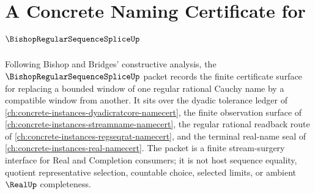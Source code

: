 \chapter{A Concrete Naming Certificate for $\BishopRegularSequenceSpliceUp$}
\label{ch:concrete-instances-bishop-regular-sequence-splice-namecert}

Following Bishop and Bridges' constructive analysis, the $\BishopRegularSequenceSpliceUp$ packet records the finite certificate surface for replacing a bounded window of one regular rational Cauchy name by a compatible window from another. It sits over the dyadic tolerance ledger of \autoref{ch:concrete-instances-dyadicratcore-namecert}, the finite observation surface of \autoref{ch:concrete-instances-streamname-namecert}, the regular rational readback route of \autoref{ch:concrete-instances-regseqrat-namecert}, and the terminal real-name seal of \autoref{ch:concrete-instances-real-namecert}. The packet is a finite stream-surgery interface for Real and Completion consumers; it is not host sequence equality, quotient representative selection, countable choice, selected limits, or ambient $\RealUp$ completeness.

